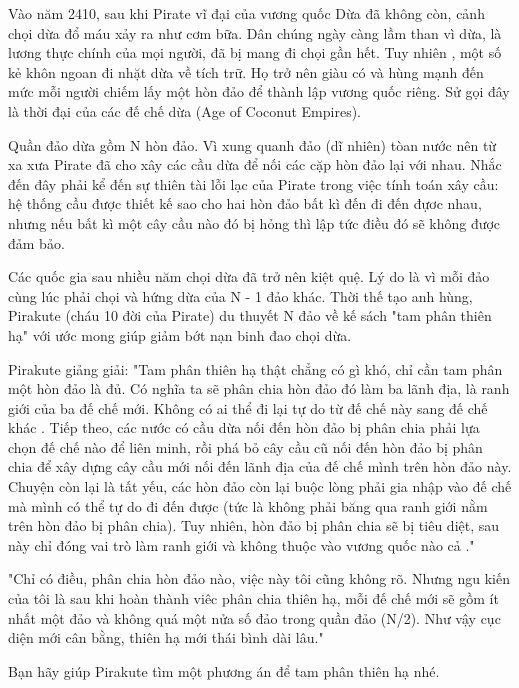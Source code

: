 



   Vào năm 2410, sau khi Pirate vĩ đại của vương quốc Dừa đã không còn, cảnh chọi dừa đổ máu xảy ra như cơm bữa. Dân chúng ngày càng lầm than vì dừa, là lương thực chính của mọi người, đã bị mang đi chọi gần hết. Tuy nhiên , một số kẻ khôn ngoan đi nhặt dừa về tích trữ. Họ trở nên giàu có và hùng mạnh đến mức mỗi người chiếm lấy một hòn đảo để thành lập vương quốc riêng. Sử gọi đây là thời đại của các đế chế dừa (Age of Coconut Empires).  

   Quần đảo dừa gồm N hòn đảo. Vì xung quanh đảo (dĩ nhiên) tòan nước nên từ xa xưa Pirate đã cho xây các cầu dừa để nối các cặp hòn đảo lại với nhau. Nhắc đến đây phải kể đến sự thiên tài lỗi lạc của Pirate trong việc tính toán xây cầu: hệ thống cầu được thiết kế sao cho hai hòn đảo bất kì đến đi đến đựơc nhau, nhưng nếu bất kì một cây cầu nào đó bị hỏng thì lập tức điều đó sẽ không được đảm bảo.  

   Các quốc gia sau nhiều năm chọi dừa đã trở nên kiệt quệ. Lý do là vì mỗi đảo cùng lúc phải chọi và hứng dừa của N - 1 đảo khác. Thời thế tạo anh hùng, Pirakute (cháu 10 đời của Pirate) du thuyết N đảo về kế sách "tam phân thiên hạ" với ước mong giúp giảm bớt nạn binh đao chọi dừa.  

   Pirakute giảng giải: "Tam phân thiên hạ thật chẳng có gì khó, chỉ cần tam phân một hòn đảo là đủ. Có nghĩa ta sẽ phân chia hòn đảo đó làm ba lãnh địa, là ranh giới của ba đế chế mới.   Không có ai thể đi lại tự do từ đế chế này sang đế chế khác   . Tiếp theo, các nước có cầu dừa nối đến hòn đảo bị phân chia phải lựa chọn đế chế nào để liên minh, rồi phá bỏ cây cầu cũ nối đến hòn đảo bị phân chia để xây dựng cây cầu mới nối đến lãnh địa của đế chế mình trên hòn đảo này. Chuyện còn lại là tất yếu, các hòn đảo còn lại buộc lòng phải gia nhập vào đế chế mà mình có thể tự do đi đến được (tức là   không phải băng qua ranh giới   nằm trên hòn đảo bị phân chia). Tuy nhiên, hòn đảo bị phân chia sẽ bị tiêu diệt, sau này chỉ đóng vai trò làm ranh giới và   không thuộc vào vương quốc nào cả   ."  

   "Chỉ có điều, phân chia hòn đảo nào, việc này tôi cũng không rõ. Nhưng ngu kiến của tôi là sau khi hoàn thành viêc phân chia thiên hạ, mỗi đế chế mới sẽ gồm ít nhất một đảo và không quá một nửa số đảo trong quần đảo (N/2). Như vậy cục diện mới cân bằng, thiên hạ mới thái bình dài lâu."  

   Bạn hãy giúp Pirakute tìm một phương án để tam phân thiên hạ nhé.  

